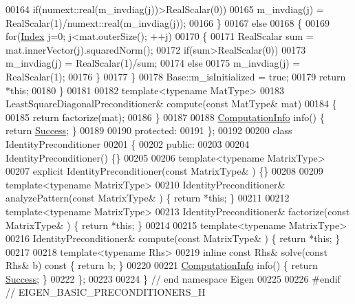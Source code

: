 \begin{DoxyCode}
00164           \textcolor{keywordflow}{if}(numext::real(m\_invdiag(j))>RealScalar(0))
00165             m\_invdiag(j) = RealScalar(1)/numext::real(m\_invdiag(j));
00166       \}
00167       \textcolor{keywordflow}{else}
00168       \{
00169         \textcolor{keywordflow}{for}(\hyperlink{namespace_eigen_a62e77e0933482dafde8fe197d9a2cfde}{Index} j=0; j<mat.outerSize(); ++j)
00170         \{
00171           RealScalar sum = mat.innerVector(j).squaredNorm();
00172           \textcolor{keywordflow}{if}(sum>RealScalar(0))
00173             m\_invdiag(j) = RealScalar(1)/sum;
00174           \textcolor{keywordflow}{else}
00175             m\_invdiag(j) = RealScalar(1);
00176         \}
00177       \}
00178       Base::m\_isInitialized = \textcolor{keyword}{true};
00179       \textcolor{keywordflow}{return} *\textcolor{keyword}{this};
00180     \}
00181     
00182     \textcolor{keyword}{template}<\textcolor{keyword}{typename} MatType>
00183     LeastSquareDiagonalPreconditioner& compute(\textcolor{keyword}{const} MatType& mat)
00184     \{
00185       \textcolor{keywordflow}{return} factorize(mat);
00186     \}
00187     
00188     \hyperlink{group__enums_ga85fad7b87587764e5cf6b513a9e0ee5e}{ComputationInfo} info() \{ \textcolor{keywordflow}{return} \hyperlink{group__enums_gga85fad7b87587764e5cf6b513a9e0ee5ea52581b035f4b59c203b8ff999ef5fcea}{Success}; \}
00189 
00190   \textcolor{keyword}{protected}:
00191 \};
00192 
00200 \textcolor{keyword}{class }IdentityPreconditioner
00201 \{
00202   \textcolor{keyword}{public}:
00203 
00204     IdentityPreconditioner() \{\}
00205 
00206     \textcolor{keyword}{template}<\textcolor{keyword}{typename} MatrixType>
00207     \textcolor{keyword}{explicit} IdentityPreconditioner(\textcolor{keyword}{const} MatrixType& ) \{\}
00208     
00209     \textcolor{keyword}{template}<\textcolor{keyword}{typename} MatrixType>
00210     IdentityPreconditioner& analyzePattern(\textcolor{keyword}{const} MatrixType& ) \{ \textcolor{keywordflow}{return} *\textcolor{keyword}{this}; \}
00211     
00212     \textcolor{keyword}{template}<\textcolor{keyword}{typename} MatrixType>
00213     IdentityPreconditioner& factorize(\textcolor{keyword}{const} MatrixType& ) \{ \textcolor{keywordflow}{return} *\textcolor{keyword}{this}; \}
00214 
00215     \textcolor{keyword}{template}<\textcolor{keyword}{typename} MatrixType>
00216     IdentityPreconditioner& compute(\textcolor{keyword}{const} MatrixType& ) \{ \textcolor{keywordflow}{return} *\textcolor{keyword}{this}; \}
00217     
00218     \textcolor{keyword}{template}<\textcolor{keyword}{typename} Rhs>
00219     \textcolor{keyword}{inline} \textcolor{keyword}{const} Rhs& solve(\textcolor{keyword}{const} Rhs& b)\textcolor{keyword}{ const }\{ \textcolor{keywordflow}{return} b; \}
00220     
00221     \hyperlink{group__enums_ga85fad7b87587764e5cf6b513a9e0ee5e}{ComputationInfo} info() \{ \textcolor{keywordflow}{return} \hyperlink{group__enums_gga85fad7b87587764e5cf6b513a9e0ee5ea52581b035f4b59c203b8ff999ef5fcea}{Success}; \}
00222 \};
00223 
00224 \} \textcolor{comment}{// end namespace Eigen}
00225 
00226 \textcolor{preprocessor}{#endif // EIGEN\_BASIC\_PRECONDITIONERS\_H}
\end{DoxyCode}

